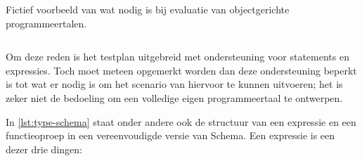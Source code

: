 \begin{listing}
    \caption{Fictief voorbeeld van wat nodig is bij evaluatie van objectgerichte programmeertalen.}
    \label{lst:oop-example}
    \inputminted{java}{code/assignment.jshell}
\end{listing}

Om deze reden is het testplan uitgebreid met ondersteuning voor statements en expressies.
Toch moet meteen opgemerkt worden dan deze ondersteuning beperkt is tot wat er nodig is om het scenario van hiervoor te kunnen uitvoeren;
het is zeker niet de bedoeling om een volledige eigen programmeertaal te ontwerpen.

In \cref{lst:type-schema} staat onder andere ook de structuur van een expressie en een functieoproep in een vereenvoudigde versie van  Schema.
Een expressie is een dezer drie dingen:
